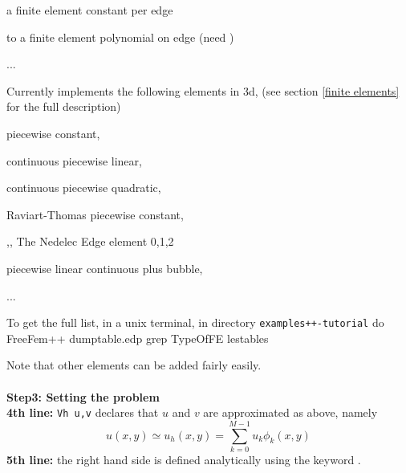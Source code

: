 \documentclass[a4paper,twoside,12pt]{book}
\begin{document}
{\par {} a finite element constant per edge 
\par {} to   a finite element polynomial  on edge (need   )

\par {...} \par
}

Currently \freefempp implements the following elements  in 3d, (see section \ref{finite elements} for the full description)
{\parskip=0cm
\par {} piecewise constant,
\par {} continuous piecewise linear,
\par {} continuous piecewise quadratic,
\par {} Raviart-Thomas piecewise constant,
\par {},, The Nedelec Edge element 0,1,2 
\par {} piecewise linear continuous plus bubble,
\par {...} \par
}
To get the full list, in a unix terminal, in directory \texttt{examples++-tutorial} do
\bFF
FreeFem++ dumptable.edp
grep TypeOfFE lestables
\eFF

Note that other elements can be added fairly easily.
\\\\
\textbf{Step3: Setting the problem}
\\
\textbf{4th line:} \texttt{Vh u,v} declares that $u$ and $v$ are approximated as above,
namely
\begin{equation}\label{defu}
u(x,y)\simeq u_h(x,y)=\sum_{k=0}^{M-1} u_k\phi_k(x,y)
\end{equation}
\textbf{5th line:} the right hand side  is defined analytically using the keyword
.
\end{document}
